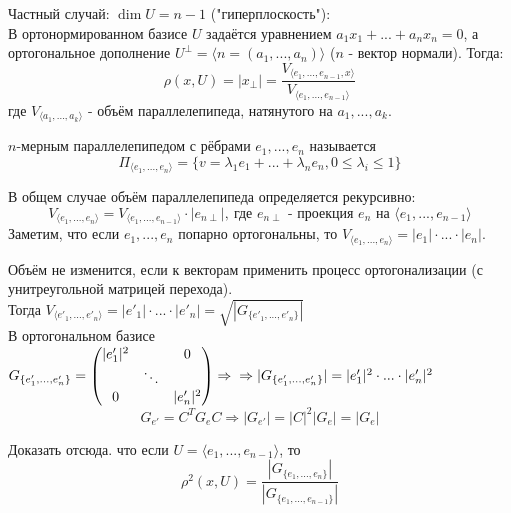 Частный случай: $\dim U = n-1$ ("гиперплоскость"):\\
В ортонормированном базисе $U$ задаётся уравнением $a_1x_1 +...+a_nx_n = 0$, а ортогональное дополнение $U^{\perp} = \langle n = (a_1,...,a_n)\rangle$ ($n$ - вектор нормали). Тогда:
$$\rho(x, U) = |x_{\perp}| = \frac{V_{\langle e_1,...,e_{n-1},x\rangle}}{V_{\langle e_1,...,e_{n-1}\rangle}}$$
где $V_{\langle a_1,...,a_k\rangle}$ - объём параллелепипеда, натянутого на $a_1,...,a_k$.
\begin{definition}
    $n$-мерным параллелепипедом с рёбрами $e_1,...,e_n$ называется
    $$\Pi_{\langle e_1,...,e_n\rangle} = \{v = \lambda_1e_1 + ... + \lambda_{n}e_{n}, 0\leqslant\lambda_i\leqslant1\}$$
\end{definition}
\begin{definition}
    В общем случае объём параллелепипеда определяется рекурсивно:
    $$V_{\langle e_1,...,e_n\rangle} = V_{\langle e_1,...,e_{n-1}\rangle} \cdot |e_{n\perp}|,  \ \text{где $e_{n\perp}$ - проекция $e_n$ на $\langle e_1,...,e_{n-1}\rangle$}$$
    Заметим, что если $e_1,...,e_n$ попарно ортогональны, то $V_{\langle e_1,...,e_n\rangle} = |e_1|\cdot...\cdot|e_n|$.
\end{definition}

Объём не изменится, если к векторам применить процесс ортогонализации (с унитреугольной матрицей перехода).\\
Тогда $V_{\langle e'_1,...,e'_n\rangle} = |e'_1|\cdot...\cdot|e'_n| = \sqrt{|G_{\{ e'_1,...,e'_n\}}|}$\\
В ортогональном базисе $G_{\{ e'_1,...,e'_n\}} = \begin{pmatrix} |e'_1|^2 &\null&0 \\ \null&\ddots&\null \\ 0&\null&|e'_n|^2 \end{pmatrix} \Rightarrow \\ \Rightarrow |G_{\{ e'_1,...,e'_n\}}| = |e'_1|^2\cdot...\cdot|e'_n|^2$
$$G_{e'} = C^TG_eC \Rightarrow |G_{e'}| = |C|^2|G_e| = |G_e|$$
\begin{exercise}
    Доказать отсюда. что если $U = \langle e_1,...,e_{n-1}\rangle$, то
    $$\rho^2(x, U) = \frac{|G_{\{ e_1,...,e_n\}}|}{|G_{\{ e_1,...,e_{n-1}\}}|}$$
\end{exercise}
